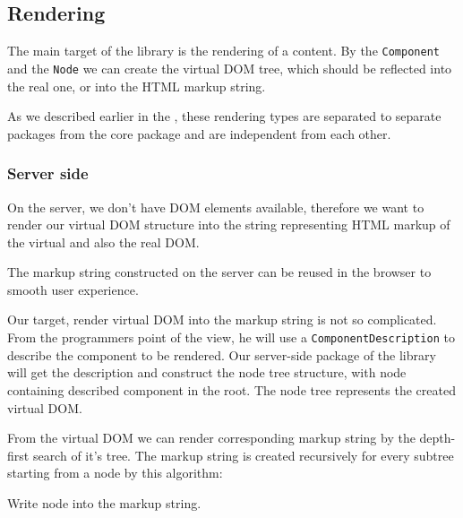       

  \subsection{Rendering}\label{subsec:our-architecture-rendering}

    The main target of the \tiles library is the rendering of a content. 
    By the \texttt{Component} and the \texttt{Node} we can create the virtual DOM tree, 
    which should be reflected into the real one, or into the HTML markup string. 

    As we described earlier in the , 
    these rendering types are separated to separate packages from the core package and are independent from each other. 

    \subsubsection{Server side}\label{subsec:our-architecture-rendering-server}
      On the server, we don't have DOM elements available, 
      therefore we want to render our virtual DOM structure into the string
      representing HTML markup of the virtual and also the real DOM.

      The markup string constructed on the server can be reused in the browser to smooth user experience. 

      Our target, render virtual DOM into the markup string is not so complicated.
      From the programmers point of the view, 
      he will use a \texttt{ComponentDescription} to describe the component to be rendered.
      Our server-side package of the library will get the description and construct the node tree structure, 
      with node containing described component in the root. 
      The node tree represents the created virtual DOM. 

      From the virtual DOM we can render corresponding markup string by the depth-first search of it's tree. 
      The markup string is created recursively for every subtree starting from a node by this algorithm:

      \begin{algorithm}[H]
        \caption{Write node into the markup string.}
      \end{algorithm}

